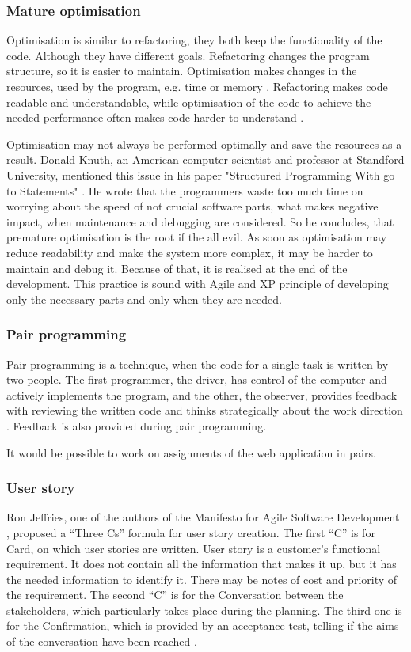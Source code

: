 \subsubsection{Mature optimisation}
Optimisation is similar to refactoring, they both keep the functionality of the code. Although they have different goals. Refactoring changes the program structure, so it is easier to maintain. Optimisation makes changes in the resources, used by the program, e.g. time or memory \cite{lc_effectively}. Refactoring makes code readable and understandable, while optimisation of the code to achieve the needed performance often makes code harder to understand \cite{ref_ec}.

Optimisation may not always be performed optimally and save the resources as a result. Donald Knuth, an American computer scientist and professor at Standford University, mentioned this issue in his paper "Structured Programming With go to Statements" \cite{knuth_goto}. He wrote that the programmers waste too much time on worrying about the speed of not crucial software parts, what makes negative impact, when maintenance and debugging are considered. So he concludes, that premature optimisation is the root if the all evil. As soon as optimisation may reduce readability and make the system more complex, it may be harder to maintain and debug it. Because of that, it is realised at the end of the development. This practice is sound with Agile and XP principle of developing only the necessary parts and only when they are needed.

\subsubsection{Pair programming}
Pair programming is a technique, when the code for a single task is written by two people. The first programmer, the driver, has control of the computer and actively implements the program, and the other, the observer, provides feedback with reviewing the written code and thinks strategically about the work direction \cite{pair_prog}. Feedback is also provided during pair programming. 

It would be possible to work on assignments of the web application in pairs.

\subsubsection{User story}
Ron Jeffries, one of the authors of the Manifesto for Agile Software Development \cite{manifesto}, proposed a ``Three Cs'' formula for user story creation. The first ``C'' is for Card, on which user stories are written. User story is a customer's functional requirement. It does not contain all the information that makes it up, but it has the needed information to identify it. There may be notes of cost and priority of the requirement. The second ``C'' is for the Conversation between the stakeholders, which particularly takes place during the planning. The third one is for the Confirmation, which is provided by an acceptance test, telling if the aims of the conversation have been reached \cite{rj_3c}.

